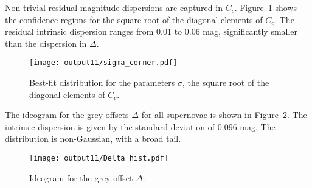 \documentclass[11pt, oneside]{article}   	%
\begin{document}
Non-trivial residual magnitude dispersions are captured in $C_c$.   Figure~\ref{sigma:fig} shows the confidence regions for the
square root of the diagonal elements of $C_c$.  The residual intrinsic dispersion ranges from 0.01 to 0.06 mag, significantly smaller
than the dispersion in $\Delta$.

 
 \begin{figure}[htbp] %
   \centering
   \texttt{[image: output11/sigma\_corner.pdf]} 
   \caption{Best-fit distribution for the parameters $\sigma$, the square root of the diagonal elements of $C_c$.
   \label{sigma:fig}}
\end{figure}

The ideogram for the grey offsets $\Delta$ for all supernovae is shown in Figure~\ref{hist:fig}.  The intrinsic dispersion
is given by the standard deviation of $0.096$ mag.  The distribution is non-Gaussian, with a broad tail. 
\begin{figure}[htbp] %
   \centering
   \texttt{[image: output11/Delta\_hist.pdf]} 
   \caption{Ideogram for the grey offset $\Delta$.
   \label{hist:fig}}
\end{figure}
\end{document}
